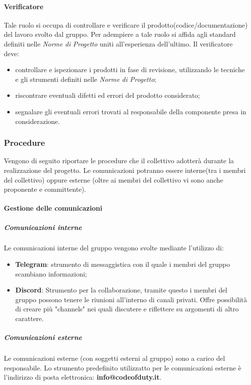 			\paragraph{Verificatore}
			Tale ruolo si occupa di controllare e verificare il prodotto(codice/documentazione) del lavoro svolto dal gruppo. Per adempiere a tale ruolo si affida agli standard definiti nelle \textit{Norme di Progetto} uniti all'esperienza dell'ultimo. Il verificatore deve:
			\begin{itemize}
				\item controllare e ispezionare i prodotti in fase di revisione, utilizzando le tecniche e gli strumenti definiti nelle \textit{Norme di Progetto};
				\item riscontrare eventuali difetti ed errori del prodotto considerato;
				\item segnalare gli eventuali errori trovati al responsabile della componente presa in considerazione.
			\end{itemize}
		
		
		\subsubsection{Procedure}
		Vengono di seguito riportare le procedure che il collettivo adotterà durante la realizzazione del progetto. Le comunicazioni potranno essere interne(tra i membri del collettivo) oppure esterne (oltre ai membri del collettivo vi sono anche proponente e committente).
		
			\paragraph{Gestione delle comunicazioni}
			
				\subparagraph{Comunicazioni interne}
				Le comunicazioni interne del gruppo vengono svolte mediante l'utilizzo di:
				\begin{itemize}
					\item \textbf{Telegram}: strumento di messaggistica con il quale i membri del gruppo scambiano informazioni;
					\item \textbf{Discord}: Strumento per la collaborazione, tramite questo i membri del gruppo possono tenere le riunioni all'interno di canali privati. Offre possibilità di creare più "channels" nei quali discutere e riflettere su argomenti di altro carattere.
				\end{itemize}  
				
				\subparagraph{Comunicazioni esterne}
				Le comunicazioni esterne (con soggetti esterni al gruppo) sono a carico del responsabile. Lo strumento predefinito utilizzatto per le comunicazioni esterne è l'indirizzo di posta elettronica: \textbf{info@codeofduty.it}.
				
